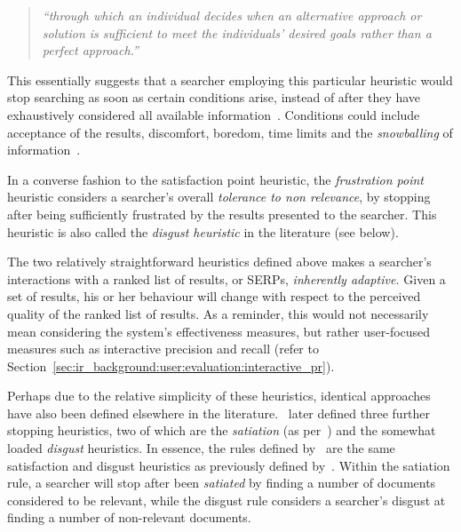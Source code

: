 \begin{quote}
    \emph{``through which an individual decides when an alternative approach or solution is sufficient to meet the individuals' desired goals rather than a perfect approach.''}
\end{quote}

This essentially suggests that a searcher employing this particular heuristic would stop searching as soon as certain conditions arise, instead of after they have exhaustively considered all available information~\citep{march1994primer}. Conditions could include acceptance of the results, discomfort, boredom, time limits and the \emph{snowballing} of information~\citep{mansourian2007search}.

\noindent{}
In a converse fashion to the satisfaction point heuristic, the \emph{frustration point} heuristic considers a searcher's overall \emph{tolerance to non relevance}, by stopping after being sufficiently frustrated by the results presented to the searcher. This heuristic is also called the \emph{disgust heuristic} in the literature (see below).

The two relatively straightforward heuristics defined above makes a searcher's interactions with a ranked list of results, or SERPs, \emph{inherently adaptive.} Given a set of results, his or her behaviour will change with respect to the perceived quality of the ranked list of results. As a reminder, this would not necessarily mean considering the system's effectiveness measures, but rather user-focused measures such as interactive precision and recall (refer to Section~\ref{sec:ir_background:user:evaluation:interactive_pr}).

\noindent{}
Perhaps due to the relative simplicity of these heuristics, identical approaches have also been defined elsewhere in the literature.~\cite{kraft1979stopping_rules} later defined three further stopping heuristics, two of which are the \emph{satiation} (as per~\cite{simon1955satiation}) and the somewhat loaded \emph{disgust} heuristics. In essence, the rules defined by~\cite{kraft1979stopping_rules} are the same satisfaction and disgust heuristics as previously defined by~\cite{cooper1973retrieval_effectiveness_ii}. Within the satiation rule, a searcher will stop after been \emph{satiated} by finding a number of documents considered to be relevant, while the disgust rule considers a searcher's disgust at finding a number of non-relevant documents.

